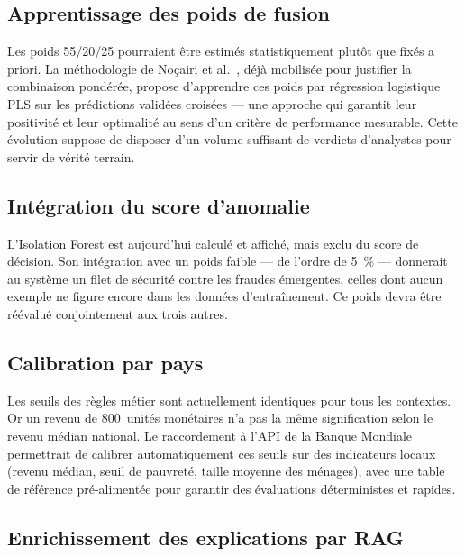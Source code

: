 \documentclass[a4paper, oneside, 12pt]{book}
\begin{document}
\subsection{Apprentissage des poids de fusion}

\hspace{0.5cm}Les poids 55/20/25 pourraient être estimés statistiquement plutôt que fixés a priori. La méthodologie de Noçairi et al.~\cite{nocairi2016stacking}, déjà mobilisée pour justifier la combinaison pondérée, propose d'apprendre ces poids par régression logistique PLS sur les prédictions validées croisées — une approche qui garantit leur positivité et leur optimalité au sens d'un critère de performance mesurable. Cette évolution suppose de disposer d'un volume suffisant de verdicts d'analystes pour servir de vérité terrain.

\subsection{Intégration du score d'anomalie}

\hspace{0.5cm}L'Isolation Forest est aujourd'hui calculé et affiché, mais exclu du score de décision. Son intégration avec un poids faible — de l'ordre de 5~\% — donnerait au système un filet de sécurité contre les fraudes émergentes, celles dont aucun exemple ne figure encore dans les données d'entraînement. Ce poids devra être réévalué conjointement aux trois autres.

\subsection{Calibration par pays}

\hspace{0.5cm}Les seuils des règles métier sont actuellement identiques pour tous les contextes. Or un revenu de 800~unités monétaires n'a pas la même signification selon le revenu médian national. Le raccordement à l'API de la Banque Mondiale permettrait de calibrer automatiquement ces seuils sur des indicateurs locaux (revenu médian, seuil de pauvreté, taille moyenne des ménages), avec une table de référence pré-alimentée pour garantir des évaluations déterministes et rapides.

\subsection{Enrichissement des explications par RAG}
\end{document}
